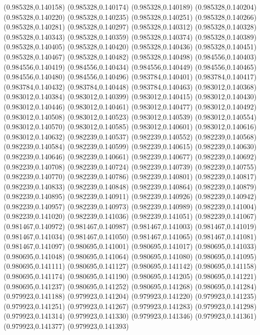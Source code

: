 (0.985328,0.140158)
(0.985328,0.140174)
(0.985328,0.140189)
(0.985328,0.140204)
(0.985328,0.140220)
(0.985328,0.140235)
(0.985328,0.140251)
(0.985328,0.140266)
(0.985328,0.140281)
(0.985328,0.140297)
(0.985328,0.140312)
(0.985328,0.140328)
(0.985328,0.140343)
(0.985328,0.140359)
(0.985328,0.140374)
(0.985328,0.140389)
(0.985328,0.140405)
(0.985328,0.140420)
(0.985328,0.140436)
(0.985328,0.140451)
(0.985328,0.140467)
(0.985328,0.140482)
(0.985328,0.140498)
(0.984556,0.140403)
(0.984556,0.140419)
(0.984556,0.140434)
(0.984556,0.140449)
(0.984556,0.140465)
(0.984556,0.140480)
(0.984556,0.140496)
(0.983784,0.140401)
(0.983784,0.140417)
(0.983784,0.140432)
(0.983784,0.140448)
(0.983784,0.140463)
(0.983012,0.140368)
(0.983012,0.140384)
(0.983012,0.140399)
(0.983012,0.140415)
(0.983012,0.140430)
(0.983012,0.140446)
(0.983012,0.140461)
(0.983012,0.140477)
(0.983012,0.140492)
(0.983012,0.140508)
(0.983012,0.140523)
(0.983012,0.140539)
(0.983012,0.140554)
(0.983012,0.140570)
(0.983012,0.140585)
(0.983012,0.140601)
(0.983012,0.140616)
(0.983012,0.140632)
(0.982239,0.140537)
(0.982239,0.140552)
(0.982239,0.140568)
(0.982239,0.140584)
(0.982239,0.140599)
(0.982239,0.140615)
(0.982239,0.140630)
(0.982239,0.140646)
(0.982239,0.140661)
(0.982239,0.140677)
(0.982239,0.140692)
(0.982239,0.140708)
(0.982239,0.140724)
(0.982239,0.140739)
(0.982239,0.140755)
(0.982239,0.140770)
(0.982239,0.140786)
(0.982239,0.140801)
(0.982239,0.140817)
(0.982239,0.140833)
(0.982239,0.140848)
(0.982239,0.140864)
(0.982239,0.140879)
(0.982239,0.140895)
(0.982239,0.140911)
(0.982239,0.140926)
(0.982239,0.140942)
(0.982239,0.140957)
(0.982239,0.140973)
(0.982239,0.140989)
(0.982239,0.141004)
(0.982239,0.141020)
(0.982239,0.141036)
(0.982239,0.141051)
(0.982239,0.141067)
(0.981467,0.140972)
(0.981467,0.140987)
(0.981467,0.141003)
(0.981467,0.141019)
(0.981467,0.141034)
(0.981467,0.141050)
(0.981467,0.141065)
(0.981467,0.141081)
(0.981467,0.141097)
(0.980695,0.141001)
(0.980695,0.141017)
(0.980695,0.141033)
(0.980695,0.141048)
(0.980695,0.141064)
(0.980695,0.141080)
(0.980695,0.141095)
(0.980695,0.141111)
(0.980695,0.141127)
(0.980695,0.141142)
(0.980695,0.141158)
(0.980695,0.141174)
(0.980695,0.141190)
(0.980695,0.141205)
(0.980695,0.141221)
(0.980695,0.141237)
(0.980695,0.141252)
(0.980695,0.141268)
(0.980695,0.141284)
(0.979923,0.141188)
(0.979923,0.141204)
(0.979923,0.141220)
(0.979923,0.141235)
(0.979923,0.141251)
(0.979923,0.141267)
(0.979923,0.141283)
(0.979923,0.141298)
(0.979923,0.141314)
(0.979923,0.141330)
(0.979923,0.141346)
(0.979923,0.141361)
(0.979923,0.141377)
(0.979923,0.141393)
